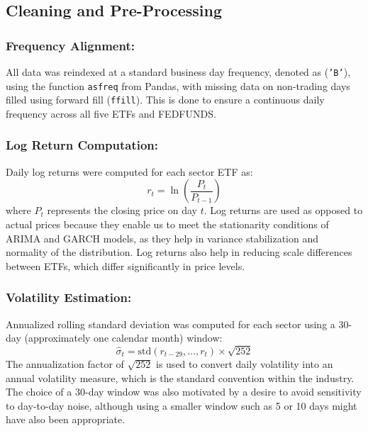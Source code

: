 \documentclass[12pt]{article}
\begin{document}
\subsection{Cleaning and Pre-Processing}
\label{sec:cleaning}

\subsubsection{Frequency Alignment:} All data was reindexed at a standard business day frequency, denoted as (\texttt{'B'}), using the function \texttt{asfreq} from Pandas, with missing data on non-trading days filled using forward fill (\texttt{ffill}). This is done to ensure a continuous daily frequency across all five ETFs and FEDFUNDS.

\subsubsection{Log Return Computation:} Daily log returns were computed for each sector ETF as:
\[
r_t = \ln\!\left(\frac{P_t}{P_{t-1}}\right)
\]
where $P_t$ represents the closing price on day $t$. Log returns are used as opposed to actual prices because they enable us to meet the stationarity conditions of ARIMA and GARCH models, as they help in variance stabilization and normality of the distribution. Log returns also help in reducing scale differences between ETFs, which differ significantly in price levels.

\subsubsection{Volatility Estimation:}
Annualized rolling standard deviation was computed for each sector using a 30-day (approximately one calendar month) window:
\[
\hat{\sigma}_t = \text{std}(r_{t-29}, \ldots, r_t) \times \sqrt{252}
\]
The annualization factor of $\sqrt{252}$ is used to convert daily volatility into an annual volatility measure, which is the standard convention within the industry. The choice of a 30-day window was also motivated by a desire to avoid sensitivity to day-to-day noise, although using a smaller window such as 5 or 10 days might have also been appropriate.
\end{document}
